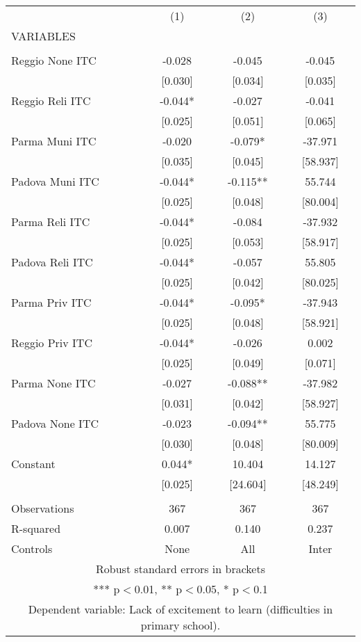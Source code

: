 \begin{tabular}{lccc} \hline
 & (1) & (2) & (3) \\
VARIABLES &  &  &  \\ \hline
 &  &  &  \\
Reggio None ITC & -0.028 & -0.045 & -0.045 \\
 & [0.030] & [0.034] & [0.035] \\
Reggio Reli ITC & -0.044* & -0.027 & -0.041 \\
 & [0.025] & [0.051] & [0.065] \\
Parma Muni ITC & -0.020 & -0.079* & -37.971 \\
 & [0.035] & [0.045] & [58.937] \\
Padova Muni ITC & -0.044* & -0.115** & 55.744 \\
 & [0.025] & [0.048] & [80.004] \\
Parma Reli ITC & -0.044* & -0.084 & -37.932 \\
 & [0.025] & [0.053] & [58.917] \\
Padova Reli ITC & -0.044* & -0.057 & 55.805 \\
 & [0.025] & [0.042] & [80.025] \\
Parma Priv ITC & -0.044* & -0.095* & -37.943 \\
 & [0.025] & [0.048] & [58.921] \\
Reggio Priv ITC & -0.044* & -0.026 & 0.002 \\
 & [0.025] & [0.049] & [0.071] \\
Parma None ITC & -0.027 & -0.088** & -37.982 \\
 & [0.031] & [0.042] & [58.927] \\
Padova None ITC & -0.023 & -0.094** & 55.775 \\
 & [0.030] & [0.048] & [80.009] \\
Constant & 0.044* & 10.404 & 14.127 \\
 & [0.025] & [24.604] & [48.249] \\
 &  &  &  \\
Observations & 367 & 367 & 367 \\
R-squared & 0.007 & 0.140 & 0.237 \\
 Controls & None & All & Inter \\ \hline
\multicolumn{4}{c}{ Robust standard errors in brackets} \\
\multicolumn{4}{c}{ *** p$<$0.01, ** p$<$0.05, * p$<$0.1} \\
\multicolumn{4}{c}{ Dependent variable: Lack of excitement to learn (difficulties in primary school).} \\
\end{tabular}
